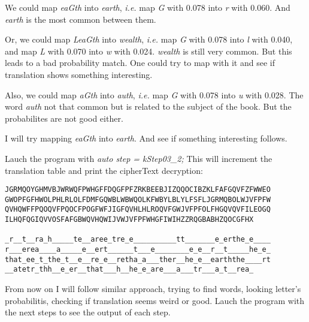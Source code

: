 We could map \textit{eaGth} into \textit{earth}, \textit{i.e.} map \textit{G} with 0.078 into \textit{r} with 0.060. And \textit{earth} is the most common between them.

Or, we could map \textit{LeaGth} into \textit{wealth}, \textit{i.e.} map \textit{G} with 0.078 into \textit{l} with 0.040, and map \textit{L} with 0.070 into \textit{w} with 0.024. \textit{wealth} is still very common. But this leads to a bad probability match. One could try to map with it and see if translation shows something interesting.

Also, we could map \textit{aGth} into \textit{auth}, \textit{i.e.} map \textit{G} with 0.078 into \textit{u} with 0.028. The word \textit{auth} not that common but is related to the subject of the book. But the probabilites are not good either.

I will try mapping \textit{eaGth} into \textit{earth}. And see if something interesting follows.

Lauch the program with \textit{auto step = kStep03\_2;} This will increment the translation table and print the cipherText decryption:

\begin{center}
\end{center}

\noindent
\begin{Verbatim}[frame=single]
JGRMQOYGHMVBJWRWQFPWHGFFDQGFPFZRKBEEBJIZQQOCIBZKLFAFGQVFZFWWEO
GWOPFGFHWOLPHLRLOLFDMFGQWBLWBWQOLKFWBYLBLYLFSFLJGRMQBOLWJVFPFW
QVHQWFFPQOQVFPQOCFPOGFWFJIGFQVHLHLROQVFGWJVFPFOLFHGQVQVFILEOGQ
ILHQFQGIQVVOSFAFGBWQVHQWIJVWJVFPFWHGFIWIHZZRQGBABHZQOCGFHX

_r__t__ra_h_____te__aree_tre_e__________tt_______e_erthe_e____
r___erea____a_____e__ert______t___e________e_e__r__t_____he_e_
that_ee_t_the_t__e__re_e__retha_a___ther__he_e__earththe____rt
__atetr_thh__e_er__that___h__he_e_are___a___tr___a_t__rea_
\end{Verbatim}

\vspace{1em}

From now on I will follow similar approach, trying to find words, looking letter's probabilitis, checking if translation seems weird or good. Lauch the program with the next steps to see the output of each step.

